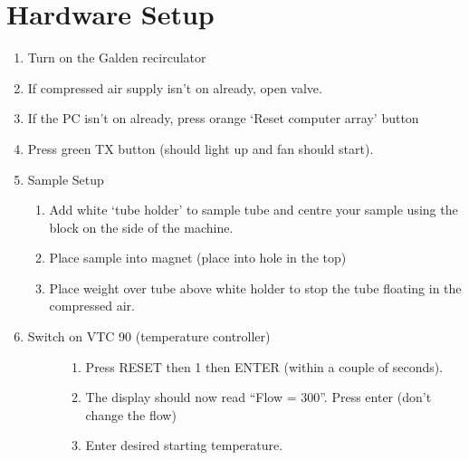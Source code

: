 \documentclass[letterpaper,10pt,english]{sphinxmanual}
\begin{document}
\section{Hardware Setup}
\label{\detokenize{stelar-ffc:hardware-setup}}\begin{enumerate}
%
\item {} 
\sphinxAtStartPar
Turn on the Galden recirculator

\item {} 
\sphinxAtStartPar
If compressed air supply isn’t on already, open valve.

\item {} 
\sphinxAtStartPar
If the PC isn’t on already, press orange ‘Reset computer array’ button

\item {} 
\sphinxAtStartPar
Press green TX button (should light up and fan should start).

\item {} 
\sphinxAtStartPar
Sample Setup
\begin{enumerate}
%
\item {} 
\sphinxAtStartPar
Add white ‘tube holder’ to sample tube and centre your sample using the block on the side of the machine.

\item {} 
\sphinxAtStartPar
Place sample into magnet (place into hole in the top)

\item {} 
\sphinxAtStartPar
Place weight over tube above white holder to stop the tube floating in the compressed air.

\end{enumerate}

\item {} \begin{description}
\item[{Switch on VTC 90 (temperature controller)}] \leavevmode\begin{enumerate}
%
\item {} 
\sphinxAtStartPar
Press RESET then 1 then ENTER (within a couple of seconds).

\item {} 
\sphinxAtStartPar
The display should now read “Flow = 300”. Press enter (don’t change the flow)

\item {} 
\sphinxAtStartPar
Enter desired starting temperature.

\end{enumerate}

\end{description}

\end{enumerate}
\end{document}
